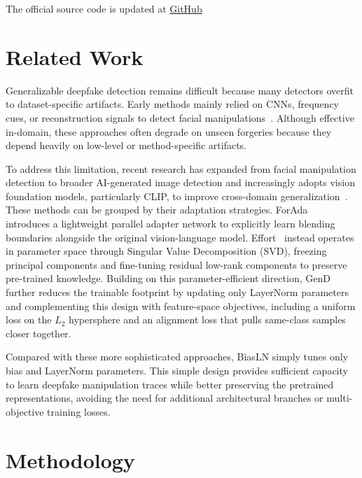\documentclass[fonts]{icst}
\begin{document}
The official source code is updated at \href{https://github.com/ducthinh4477/BiasLN}{GitHub}


\section{Related Work}

Generalizable deepfake detection remains difficult because many detectors overfit to dataset-specific artifacts. Early methods mainly relied on CNNs, frequency cues, or reconstruction signals to detect facial manipulations~\cite{rossler2019ff,luo2021srm,liu2021spsl,cao2022recce,badr2025wavit}. Although effective in-domain, these approaches often degrade on unseen forgeries because they depend heavily on low-level or method-specific artifacts.

To address this limitation, recent research has expanded from facial manipulation detection to broader AI-generated image detection and increasingly adopts vision foundation models, particularly CLIP, to improve cross-domain generalization~\cite{ojha2023universal,cui2025forada,yan2025effort,yermakov2025gend}. These methods can be grouped by their adaptation strategies. ForAda~\cite{cui2025forada} introduces a lightweight parallel adapter network to explicitly learn blending boundaries alongside the original vision-language model. Effort~\cite{yan2025effort} instead operates in parameter space through Singular Value Decomposition (SVD), freezing principal components and fine-tuning residual low-rank components to preserve pre-trained knowledge. Building on this parameter-efficient direction, GenD~\cite{yermakov2025gend} further reduces the trainable footprint by updating only LayerNorm parameters and complementing this design with feature-space objectives, including a uniform loss on the $L_2$ hypersphere and an alignment loss that pulls same-class samples closer together.

Compared with these more sophisticated approaches, BiasLN simply tunes only bias and LayerNorm parameters. This simple design provides sufficient capacity to learn deepfake manipulation traces while better preserving the pretrained representations, avoiding the need for additional architectural branches or multi-objective training losses.
 

\section{Methodology}
\label{sec:method}
\end{document}
